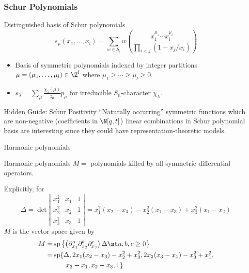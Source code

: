 \documentclass{beamer}
\renewcommand{\Span}{\operatorname{sp}}
\newcounter{c}
\begin{document}
\begin{frame}
  \frametitle{Schur Polynomials}
  Distinguished basis of Schur polynomials \[
    s_\mu(x_1,\ldots,x_l) = \sum_{w \in S_l}
    w\left(\frac{x_1^{\mu_1}\cdots x_l^{\mu_l}}{\prod_{i<j} (1-x_j/x_i)}  \right)
  \]
  \begin{itemize}\pause
  \item Basis of symmetric polynomials indexed by integer partitions
    \(\mu = (\mu_1,\ldots,\mu_l) \in \Z^l\) where \(\mu_1 \geq \cdots \geq
    \mu_l \geq 0\).\pause
  \item \(s_\lambda = \sum_\mu \frac{\chi_\lambda(\mu)}{z_\mu} p_\mu\) for
    irreducible \(S_n\)-character \(\chi_\lambda\). \pause
  \end{itemize}
  \begin{block}{Hidden Guide: Schur Positivity}
    ``Naturally occurring'' symmetric functions which are non-negative
    (coefficients in \(\N[q,t]\))
    linear combinations in Schur polynomial basis
     are interesting since they could have representation-theoretic models.
  \end{block}
\end{frame}
\begin{frame}{Harmonic polynomials}
  \begin{block}{Harmonic polynomials}
   \(M =\) polynomials killed by all symmetric differential
   operators.
  \end{block}\pause
  Explicitly, for
   \[
     \Delta = \det \left|
       \begin{matrix}
         x_1^2 & x_1 & 1\\
         x_2^2 & x_2 & 1\\
         x_3^2 & x_3 & 1
       \end{matrix}
     \right| = x_1^2(x_2-x_3) - x_2^2 (x_1 - x_3) + x_3^2(x_1-x_2)
   \]\pause
   \(M\) is the vector space given by\pause
   \begin{align*}
       M  = & \Span\left\{
\left(           \partial_{x_1}^a
           \partial_{x_2}^b  \partial_{x_3}^c
\right)         \Delta \st a,b,c \geq 0\right\} \\
        = & \Span\{\Delta, 2x_1(x_2-x_3)-x_2^2+x_3^2,
            2x_2(x_3-x_1)-x_3^2+x_1^2, \\
       & \phantom{\Span\{\}}x_3-x_1, x_2-x_3,1\}
   \end{align*}
\end{frame}
\end{document}
